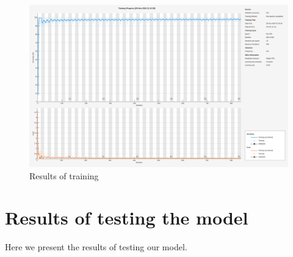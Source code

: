 \documentclass[12pt,a4paper,titlepage,openany]{report}
\begin{document}
\begin{figure}[h]
     \includegraphics[scale=0.5]{./new_training/training_chart_new.png}
     \caption{Results of training}
     \label{fig:training}
\end{figure}

\section{Results of testing the model}

Here we present the results of testing our model.
\end{document}
